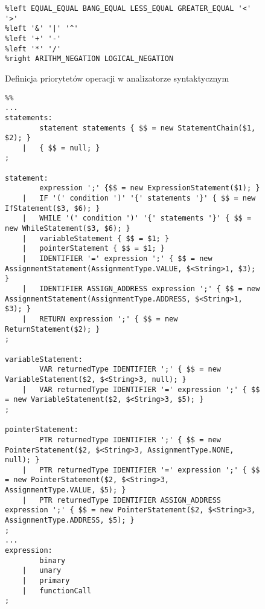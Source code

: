 \begin{figure}
\begin{lstlisting}
%left EQUAL_EQUAL BANG_EQUAL LESS_EQUAL GREATER_EQUAL '<' '>' 
%left '&' '|' '^'
%left '+' '-'
%left '*' '/'
%right ARITHM_NEGATION LOGICAL_NEGATION
\end{lstlisting}
\caption{Definicja priorytetów operacji w analizatorze syntaktycznym}
\label{fig:lst:parser-priorytety}
\end{figure}

\begin{figure}
\begin{lstlisting}
%%
...
statements:
        statement statements { $$ = new StatementChain($1, $2); }
    |   { $$ = null; }
;

statement: 
        expression ';' {$$ = new ExpressionStatement($1); }
    |   IF '(' condition ')' '{' statements '}' { $$ = new IfStatement($3, $6); }
    |   WHILE '(' condition ')' '{' statements '}' { $$ = new WhileStatement($3, $6); }
    |   variableStatement { $$ = $1; }
    |   pointerStatement { $$ = $1; }
    |   IDENTIFIER '=' expression ';' { $$ = new AssignmentStatement(AssignmentType.VALUE, $<String>1, $3); }
    |   IDENTIFIER ASSIGN_ADDRESS expression ';' { $$ = new AssignmentStatement(AssignmentType.ADDRESS, $<String>1, $3); }
    |   RETURN expression ';' { $$ = new ReturnStatement($2); }
;

variableStatement:
        VAR returnedType IDENTIFIER ';' { $$ = new VariableStatement($2, $<String>3, null); }
    |   VAR returnedType IDENTIFIER '=' expression ';' { $$ = new VariableStatement($2, $<String>3, $5); }
;

pointerStatement:
        PTR returnedType IDENTIFIER ';' { $$ = new PointerStatement($2, $<String>3, AssignmentType.NONE, null); }
    |   PTR returnedType IDENTIFIER '=' expression ';' { $$ = new PointerStatement($2, $<String>3, AssignmentType.VALUE, $5); }
    |   PTR returnedType IDENTIFIER ASSIGN_ADDRESS expression ';' { $$ = new PointerStatement($2, $<String>3, AssignmentType.ADDRESS, $5); }
;
...
expression:
        binary
    |   unary
    |   primary
    |   functionCall
;


\end{lstlisting}
\end{figure}
